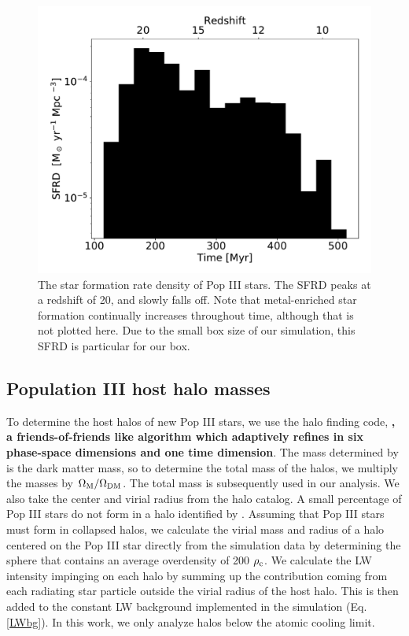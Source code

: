\documentclass[fleqn,usenatbib]{mnras}
\begin{document}
\begin{figure}
	\includegraphics[width=\columnwidth]{images/pop3_SFR_bar.pdf}
    \caption{The star formation rate density of Pop III stars. The SFRD peaks at a redshift of 20, and slowly falls off. Note that metal-enriched star formation continually increases throughout time, although that is not plotted here. Due to the small box size of our simulation, this SFRD is particular for our box.}
    \label{fig:pop3_SFR_bar}
\end{figure}

\subsection{Population III host halo masses}
 To determine the host halos of new Pop III stars, we use the halo finding code, \rockstar{} \citep{rockstar} \textbf{, a friends-of-friends like algorithm which adaptively refines in six phase-space dimensions and one time dimension}. The mass determined by \rockstar{} is the dark matter mass, so to determine the total mass of the halos, we multiply the masses by $\Omega_{\rm M}/\Omega_{\rm DM}$. The total mass is subsequently used in our analysis. We also take the center and virial radius from the \rockstar{} halo catalog. A small percentage of Pop III stars do not form in a halo identified by \rockstar{}. Assuming that Pop III stars must form in collapsed halos, we calculate the virial mass and radius of a halo centered on the Pop III star directly from the simulation data by determining the sphere that contains an average overdensity of 200 $\rho_{\rm c}$. We calculate the LW intensity impinging on each halo by summing up the contribution coming from each radiating star particle outside the virial radius of the host halo. This is then added to the constant LW background implemented in the simulation (Eq. \ref{LWbg}). In this work, we only analyze halos below the atomic cooling limit. 
\end{document}
